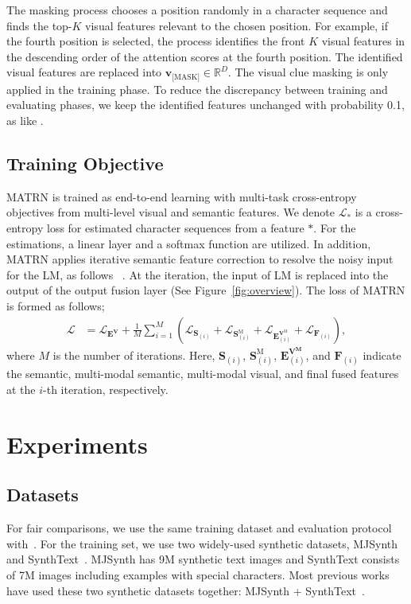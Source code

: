 \documentclass[runningheads]{llncs}
\begin{document}
The masking process chooses a position randomly in a character sequence and finds the top-$K$ visual features relevant to the chosen position. For example, if the fourth position is selected, the process identifies the front $K$ visual features in the descending order of the attention scores at the fourth position. The identified visual features are replaced into $\mathbf{v}_{\text{[MASK]}}\in\mathbb{R}^{D}$. The visual clue masking is only applied in the training phase. To reduce the discrepancy between training and evaluating phases, we keep the identified features unchanged with probability 0.1, as like \cite{devlin-etal-2019-bert}.

\subsection{Training Objective}

MATRN is trained as end-to-end learning with multi-task cross-entropy objectives from multi-level visual and semantic features. We denote $\mathcal{L}_\mathbf{*}$ is a cross-entropy loss for estimated character sequences from a feature $*$. For the estimations, a linear layer and a softmax function are utilized.
In addition, MATRN applies iterative semantic feature correction to resolve the noisy input for the LM, as follows ~\cite{ABINet,lee_etal_2018_deterministic}. At the iteration, the input of LM is replaced into the output of the output fusion layer (See Figure~\ref{fig:overview}). The loss of MATRN is formed as follows;
\begin{align}
   \mathcal{L} & = \mathcal{L}_{\mathbf{E}^{\mathbf{V}}} + \frac{1}{M} \sum_{i=1}^{M} \left ( \mathcal{L}_{\mathbf{S}_{(i)}} + \mathcal{L}_{\mathbf{S}^\text{M}_{(i)}} + \mathcal{L}_{\mathbf{E}^{\mathbf{V}^\text{M}}_{(i)}} + \mathcal{L}_{\mathbf{F}_{(i)}} \right ),
\end{align}
where $M$ is the number of iterations. Here, ${\mathbf{S}_{(i)}}$, ${\mathbf{S}^\text{M}_{(i)}}$, ${\mathbf{E}^{\mathbf{V^\text{M}}}_{(i)}}$, and ${\mathbf{F}_{(i)}}$ indicate the semantic, multi-modal semantic, multi-modal visual, and final fused features at the $i$-th iteration, respectively.   

\section{Experiments}

\subsection{Datasets}
For fair comparisons, we use the same training dataset and evaluation protocol with~\cite{ABINet,Yu_2020_CVPR_SRN}. For the training set, we use two widely-used synthetic datasets, MJSynth~\cite{Jaderberg14c_MJSynth} and SynthText~\cite{Gupta16_SynthText}. MJSynth has 9M synthetic text images and SynthText consists of 7M images including examples with special characters. Most previous works have used these two synthetic datasets together: MJSynth + SynthText~\cite{Baek_2019_ICCV_CombBest}.
\end{document}
